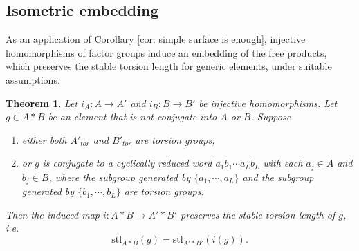 \documentclass{amsart}
\newtheorem{theorem}{Theorem}[section]
\theoremstyle{definition}
\numberwithin{equation}{section}
\theoremstyle{theorem}
\theoremstyle{remark}
\def\stl{\mathrm{stl}}
\begin{document}
	\subsection{Isometric embedding}\label{subsec: isom embed}
	As an application of Corollary \ref{cor: simple surface is enough}, injective homomorphisms of factor groups induce an embedding of the free products, which preserves the stable torsion length for generic elements, under suitable assumptions.
	\begin{theorem}\label{thm: isometric embedding}
		Let $i_A :A\to A'$ and $i_B: B\to B'$ be injective homomorphisms. Let $g\in A*B$ be an element that is not conjugate into $A$ or $B$. 
		Suppose
		\begin{enumerate}
		    \item either both $A'_{tor}$ and $B'_{tor}$ are torsion groups,\label{item: assumption one}
		    \item or $g$ is conjugate to a cyclically reduced word $a_1b_1\cdots a_Lb_L$ with each $a_j\in A$ and $b_j\in B$, 
		    where the subgroup generated by $\{a_1,\cdots, a_L\}$ and the subgroup generated by $\{b_1,\cdots,b_L\}$ are torsion groups.\label{item: assumption two}
		\end{enumerate}
		Then the induced map $i: A*B\to A'*B'$ preserves the stable torsion length of $g$, i.e. 
		$$\stl_{A*B}(g)=\stl_{A'*B'}(i(g)).$$
	\end{theorem}
\end{document}
